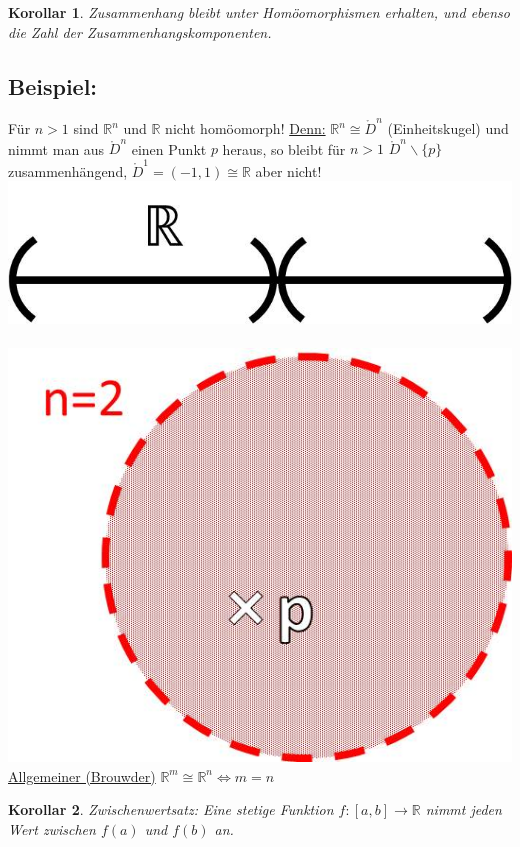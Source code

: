 \documentclass[a4paper,11pt,notitlepage]{report}
\newtheorem{corollary}{Korollar}[chapter]
\theoremstyle{remark}
\theoremstyle{definition}
\newcommand{\R}{{\ensuremath{\mathbb{R}}}}
\newenvironment{bsp}[1]
{
\setlength{\fboxsep}{10pt}
\subsection*{Beispiel: #1}
\begin{upshape}
}
{
\end{upshape}
}
\begin{document}
\begin{corollary}
	Zusammenhang bleibt unter Homöomorphismen erhalten, und ebenso die Zahl der Zusammenhangskomponenten.
\end{corollary}

\begin{bsp}{}
	Für $n > 1$ sind $\R^n$ und $\R$ nicht homöomorph!
	\newline
	\underline{Denn:} $\R^n \cong \mathring{D}^n$ (Einheitskugel) und nimmt man aus $\mathring{D}^n$ einen Punkt $p$ heraus, so bleibt für $n>1$ $\mathring{D}^n \backslash \{p\}$ zusammenhängend, $\mathring{D}^1 = (-1,1) \cong \R$ aber nicht!
	\newline
\includegraphics[scale=0.4]{images/R_ohne_p.jpg}$\qquad\qquad$
\includegraphics[scale=0.4]{images/R2_ohne_p.jpg}
	\newline
	\underline{Allgemeiner (Brouwder)} $\R^m \cong \R^n \Leftrightarrow m=n$
\end{bsp}

\begin{corollary}{Zwischenwertsatz:}
	Eine stetige Funktion $f \colon [a,b] \rightarrow \R$ nimmt jeden Wert zwischen $f(a)$ und $f(b)$ an.
\end{corollary}
\end{document}
